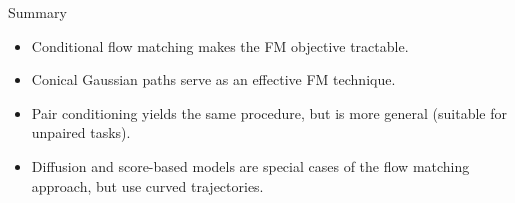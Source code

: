 \documentclass{beamer}
\begin{document}
\begin{frame}{Summary}
	\begin{itemize}
		\item Conditional flow matching makes the FM objective tractable.
		\vfill
		\item Conical Gaussian paths serve as an effective FM technique.
		\vfill
		\item Pair conditioning yields the same procedure, but is more general (suitable for unpaired tasks).
		\vfill
		\item Diffusion and score-based models are special cases of the flow matching approach, but use curved trajectories.
	\end{itemize}
\end{frame}
\end{document}
